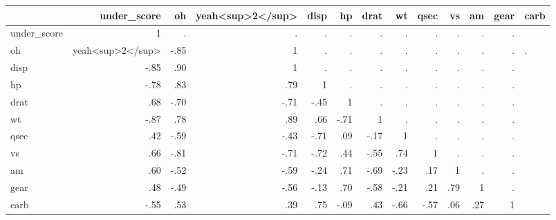 \begin{table}
\centering
\begin{tabular}[t]{lrrrrrrrrrrr}
\toprule
  & under_score & oh&yeah<sup>2</sup> & disp & hp & drat & wt & qsec & vs & am & gear & carb\\
\midrule
under_score & 1 & . & . & . & . & . & . & . & . & . & .\\
oh&yeah<sup>2</sup> & -.85 & 1 & . & . & . & . & . & . & . & . & .\\
disp & -.85 & .90 & 1 & . & . & . & . & . & . & . & .\\
hp & -.78 & .83 & .79 & 1 & . & . & . & . & . & . & .\\
drat & .68 & -.70 & -.71 & -.45 & 1 & . & . & . & . & . & .\\
wt & -.87 & .78 & .89 & .66 & -.71 & 1 & . & . & . & . & .\\
qsec & .42 & -.59 & -.43 & -.71 & .09 & -.17 & 1 & . & . & . & .\\
vs & .66 & -.81 & -.71 & -.72 & .44 & -.55 & .74 & 1 & . & . & .\\
am & .60 & -.52 & -.59 & -.24 & .71 & -.69 & -.23 & .17 & 1 & . & .\\
gear & .48 & -.49 & -.56 & -.13 & .70 & -.58 & -.21 & .21 & .79 & 1 & .\\
carb & -.55 & .53 & .39 & .75 & -.09 & .43 & -.66 & -.57 & .06 & .27 & 1\\
\bottomrule
\end{tabular}
\end{table}
